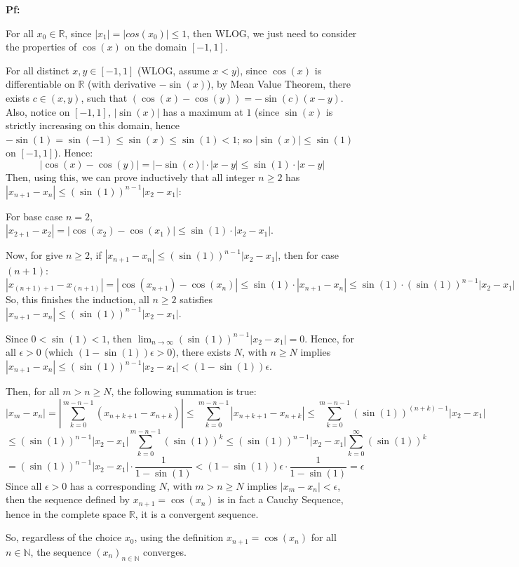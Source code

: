 \documentclass{article}
\begin{document}
\textbf{Pf:}

For all $x_0\in\mathbb{R}$, since $|x_1|=|cos(x_0)|\leq 1$, then WLOG, we just need to consider the properties of $\cos(x)$ on the domain $[-1,1]$.

For all distinct $x,y\in[-1,1]$ (WLOG, assume $x<y$), since $\cos(x)$ is differentiable on $\mathbb{R}$ (with derivative $-\sin(x)$), by Mean Value Theorem, 
there exists $c\in (x,y)$, such that $(\cos(x)-\cos(y))=-\sin(c)(x-y)$. Also, notice on $[-1,1]$, $|\sin(x)|$ has a maximum at $1$ 
(since $\sin(x)$ is strictly increasing on this domain, hence $-\sin(1)=\sin(-1)\leq \sin(x)\leq \sin(1) < 1$; so $|\sin(x)|\leq \sin(1)$ on $[-1,1]$). Hence:
$$|\cos(x)-\cos(y)|=|-\sin(c)|\cdot|x-y| \leq \sin(1)\cdot|x-y|$$
Then, using this, we can prove inductively that all integer $n\geq 2$ has $|x_{n+1}-x_n| \leq (\sin(1))^{n-1}|x_2-x_1|$:

For base case $n=2$, $|x_{2+1}-x_2| = |\cos(x_2)-\cos(x_1)| \leq \sin(1)\cdot |x_2-x_1|$.

Now, for give $n\geq 2$, if $|x_{n+1}-x_n|\leq (\sin(1))^{n-1}|x_2-x_1|$, then for case $(n+1)$:
$$|x_{(n+1)+1}-x_{(n+1)}|=|\cos(x_{n+1})-\cos(x_n)|\leq \sin(1)\cdot|x_{n+1}-x_n|\leq \sin(1)\cdot (\sin(1))^{n-1}|x_2-x_1|$$
So, this finishes the induction, all $n\geq 2$ satisfies $|x_{n+1}-x_n|\leq (\sin(1))^{n-1}|x_2-x_1|$.

Since $0<\sin(1)<1$, then $\lim_{n\rightarrow\infty}(\sin(1))^{n-1}|x_2-x_1|=0$. Hence, for all $\epsilon>0$ (which $(1-\sin(1))\epsilon>0$), there exists $N$, with $n\geq N$ implies $|x_{n+1}-x_n|\leq (\sin(1))^{n-1}|x_2-x_1|<(1-\sin(1))\epsilon$.

Then, for all $m>n\geq N$, the following summation is true:
$$|x_m-x_n| = \left|\sum_{k=0}^{m-n-1}(x_{n+k+1}-x_{n+k})\right|\leq\sum_{k=0}^{m-n-1}|x_{n+k+1}-x_{n+k}| \leq \sum_{k=0}^{m-n-1}(\sin(1))^{(n+k)-1}|x_2-x_1|$$
$$\leq (\sin(1))^{n-1}|x_2-x_1|\sum_{k=0}^{m-n-1}(\sin(1))^k\leq (\sin(1))^{n-1}|x_2-x_1|\sum_{k=0}^{\infty}(\sin(1))^k $$
$$= (\sin(1))^{n-1}|x_2-x_1|\cdot\frac{1}{1-\sin(1)} < (1-\sin(1))\epsilon\cdot\frac{1}{1-\sin(1)}=\epsilon$$
Since all $\epsilon>0$ has a corresponding $N$, with $m>n\geq N$ implies $|x_m-x_n|<\epsilon$, then the sequence defined by $x_{n+1}=\cos(x_n)$ is in fact a Cauchy Sequence,
hence in the complete space $\mathbb{R}$, it is a convergent sequence.

So, regardless of the choice $x_0$, using the definition $x_{n+1}=\cos(x_n)$ for all $n\in\mathbb{N}$, the sequence $(x_n)_{n\in\mathbb{N}}$ converges.
\end{document}
